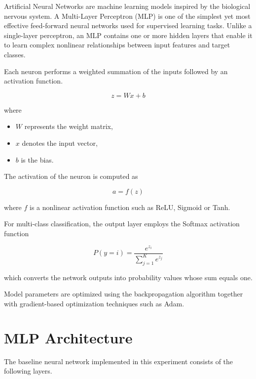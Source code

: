 \documentclass[12pt,a4paper]{article}
\begin{document}
Artificial Neural Networks are machine learning models inspired by the biological nervous system. A Multi-Layer Perceptron (MLP) is one of the simplest yet most effective feed-forward neural networks used for supervised learning tasks. Unlike a single-layer perceptron, an MLP contains one or more hidden layers that enable it to learn complex nonlinear relationships between input features and target classes.

Each neuron performs a weighted summation of the inputs followed by an activation function.

\[
z = Wx+b
\]

where

\begin{itemize}
\item $W$ represents the weight matrix,
\item $x$ denotes the input vector,
\item $b$ is the bias.
\end{itemize}

The activation of the neuron is computed as

\[
a=f(z)
\]

where $f$ is a nonlinear activation function such as ReLU, Sigmoid or Tanh.

For multi-class classification, the output layer employs the Softmax activation function

\[
P(y=i)=
\frac{e^{z_i}}
{\sum_{j=1}^{K}e^{z_j}}
\]

which converts the network outputs into probability values whose sum equals one.

Model parameters are optimized using the backpropagation algorithm together with gradient-based optimization techniques such as Adam.

\section{MLP Architecture}

The baseline neural network implemented in this experiment consists of the following layers.
\end{document}

